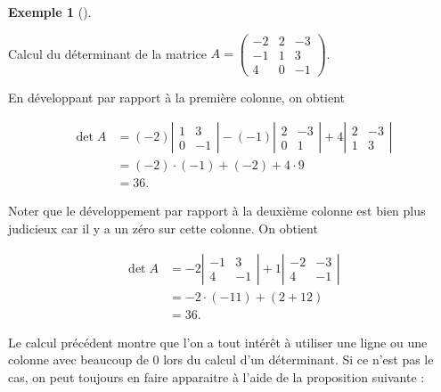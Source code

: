 \documentclass[
  french,
  letterpaper,
  DIV=11,
  numbers=noendperiod]{scrreprt}
\theoremstyle{plain}
\theoremstyle{definition}
\theoremstyle{plain}
\theoremstyle{plain}
\theoremstyle{definition}
\theoremstyle{definition}
\newtheorem{example}{Exemple}[chapter]
\theoremstyle{plain}
\theoremstyle{remark}
\begin{document}
\begin{example}[]\protect\hypertarget{exm-calcul-det-1}{}\label{exm-calcul-det-1}

Calcul du déterminant de la matrice \(A = \begin{pmatrix}
    -2&2&-3\\
-1&1&3\\
4&0&-1
\end{pmatrix}\).

En développant par rapport à la première colonne, on obtient

\[
\begin{aligned}
    \det A &= (-2)\left|\begin{matrix}1&3\\0&-1\end{matrix}\right| - (-1)\left|\begin{matrix}2&-3\\0&1\end{matrix}\right| + 4 \left|\begin{matrix}2&-3\\1&3\end{matrix}\right|\\
&= (-2)\cdot(-1) + (-2) + 4 \cdot 9\\
&= 36.
\end{aligned}
\]

Noter que le développement par rapport à la deuxième colonne est bien
plus judicieux car il y a un zéro sur cette colonne. On obtient

\[
\begin{aligned}
\det A &= -2 \left|\begin{matrix}-1&3\\4&-1\end{matrix}\right| + 1
\left|\begin{matrix}-2&-3\\4&-1\end{matrix}\right|\\
&= -2 \cdot (-11) + (2+12)\\
&= 36.
\end{aligned}
\]

\end{example}

Le calcul précédent montre que l'on a tout intérêt à utiliser une ligne
ou une colonne avec beaucoup de \(0\) lors du calcul d'un déterminant.
Si ce n'est pas le cas, on peut toujours en faire apparaitre à l'aide de
la proposition suivante :
\end{document}
